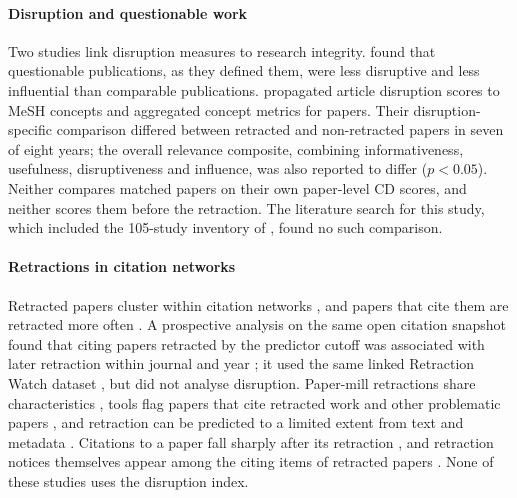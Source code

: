 \paragraph{Disruption and questionable work} Two studies link disruption measures to research integrity.
\citet{you2022questionable} found that questionable publications, as they defined them, were less disruptive and less
influential than comparable publications. \citet{copara2024mesh} propagated article disruption scores to MeSH concepts
and aggregated concept metrics for papers. Their disruption-specific comparison differed between retracted and
non-retracted papers in seven of eight years; the overall relevance composite, combining informativeness, usefulness,
disruptiveness and influence, was also reported to differ ($p<0.05$). Neither compares matched papers on their own paper-level CD
scores, and neither scores them
before the retraction. The literature search for this study, which included the 105-study inventory of
\citet{wu2026inventory}, found no such comparison.

\paragraph{Retractions in citation networks} Retracted papers cluster within citation networks
\citep{feng2024molbio,lou2026beyond}, and papers that cite them are retracted more often \citep{lou2026beyond}.
A prospective analysis on the same open citation snapshot found that citing papers retracted by the predictor cutoff
was associated with later retraction within journal and year \citep{arjomandi2026prospective}; it used the same linked
Retraction Watch dataset \citep{arjomandi2026retracteddata}, but did not analyse disruption.
Paper-mill retractions share characteristics \citep{candal2022papermills}, tools flag papers that cite retracted work
\citep{cabanac2024chain} and other problematic papers \citep{cabanac2022pps}, and retraction can be predicted to a
limited extent from text and metadata \citep{fletcher2025predicting}. Citations to a paper fall sharply after its
retraction \citep{azoulay2015retractions}, and retraction notices themselves appear among the citing items of retracted
papers \citep{hsiao2021continued}. None of these studies uses the disruption index.
